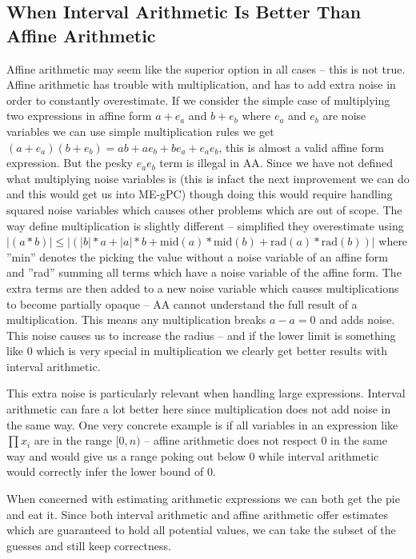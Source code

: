\subsection{When Interval Arithmetic Is Better Than Affine Arithmetic}
Affine arithmetic may seem like the superior option in all cases -- this is not true. Affine arithmetic has trouble with multiplication, and has to add extra noise in order to constantly overestimate. If we consider the simple case of multiplying two expressions in affine form $a + e_a$ and $b + e_b$ where $e_a$ and $e_b$ are noise variables we can use simple multiplication rules we get $(a + e_a)(b + e_b) = ab + ae_b + be_a + e_ae_b$, this is almost a valid affine form expression. But the pesky $e_ae_b$ term is illegal in AA. Since we have not defined what multiplying noise variables is (this is infact the next improvement we can do and this would get us into ME-gPC) though doing this would require handling squared noise variables which causes other problems which are out of scope. The way \cite{src:affAri} define multiplication is slightly different -- simplified they overestimate using $|(a * b)| \leq |(|b| * a + |a| * b + \text{mid}(a) * \text{mid}(b) + \text{rad}(a) * \text{rad}(b))|$ where ''min'' denotes the picking the value without a noise variable of an affine form and ''rad'' summing all terms which have a noise variable of the affine form. The extra terms are then added to a new noise variable which causes multiplications to become partially opaque -- AA cannot understand the full result of a multiplication. This means any multiplication breaks $a - a = 0$ and adds noise. This noise causes us to increase the radius -- and if the lower limit is something like $0$ which is very special in multiplication we clearly get better results with interval arithmetic.

This extra noise is particularly relevant when handling large expressions. Interval arithmetic can fare a lot better here since multiplication does not add noise in the same way. One very concrete example is if all variables in an expression like $\prod x_i$ are in the range $[0,n)$ -- affine arithmetic does not respect $0$ in the same way and would give us a range poking out below $0$ while interval arithmetic would correctly infer the lower bound of $0$.

When concerned with estimating arithmetic expressions we can both get the pie and eat it. Since both interval arithmetic and affine arithmetic offer estimates which are guaranteed to hold all potential values, we can take the subset of the guesses and still keep correctness.

